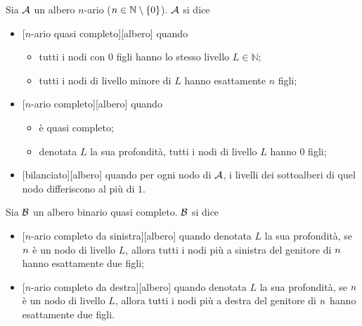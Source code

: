 \begin{Definition}
  Sia $\mathcal{A}$ un albero $n$-ario ($n \in \mathbb{N} \setminus \lbrace 0 \rbrace$).
  $\mathcal{A}$ si dice
  \begin{itemize}
    \item {}[$n$-ario quasi completo][albero]
      quando
      \begin{itemize}
        \item tutti i nodi con $0$ figli hanno lo stesso livello
          $L \in \mathbb{N}$;
        \item tutti i nodi di livello minore di $L$ hanno esattamente $n$ figli;
      \end{itemize}
    \item {}[$n$-ario completo][albero]
      quando
      \begin{itemize}
        \item \`e quasi completo;
        \item denotata $L$ la sua profondit\`a, tutti i nodi di livello $L$
          hanno $0$ figli;
      \end{itemize}
    \item {}[bilanciato][albero]
      quando per ogni nodo di $\mathcal{A}$, i livelli dei sottoalberi di quel
      nodo differiscono al pi\`u di $1$.
  \end{itemize}
\end{Definition}
\begin{Definition}
  Sia $\mathcal{B}$ un albero binario quasi completo. $\mathcal{B}$ si dice
  \begin{itemize}
    \item {}[$n$-ario completo da sinistra][albero]
      quando denotata $L$ la sua profondit\`a, se $n$ \`e un nodo di
      livello $L$, allora tutti i nodi pi\`u a sinistra del genitore
      di $n$ hanno esattamente due figli;
    \item {}[$n$-ario completo da destra][albero]
      quando denotata $L$ la sua profondit\`a, se $n$ \`e un nodo di
      livello $L$, allora tutti i nodi pi\`u a destra del genitore
      di $n$ hanno esattamente due figli.
  \end{itemize}
\end{Definition}
